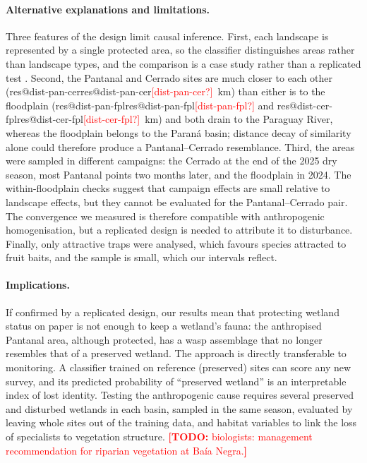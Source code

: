 \documentclass[10pt,a4paper,twocolumn]{article}
\makeatletter
\newif\ifshowtodos \showtodostrue
\newcommand{\TODO}[1]{\ifshowtodos\textcolor{red}{\textbf{[TODO:} #1\textbf{]}}\fi}
\newcommand{\res}[1]{\ifcsname res@#1\endcsname\csname res@#1\endcsname\else\textcolor{red}{[#1?]}\fi}
\makeatother
\begin{document}
\paragraph{Alternative explanations and limitations.}
Three features of the design limit causal inference. First, each landscape is represented by a single
protected area, so the classifier distinguishes areas rather than landscape types, and the
comparison is a case study rather than a replicated test \citep{hurlbert1984}. Second, the Pantanal
and Cerrado sites are much closer to each other (\res{dist-pan-cer}~km) than either is to the
floodplain (\res{dist-pan-fpl} and \res{dist-cer-fpl}~km) and both drain to the Paraguay River, whereas
the floodplain belongs to the Paraná basin; distance decay of similarity \citep{soininen2007} alone
could therefore produce a Pantanal--Cerrado resemblance. Third, the areas were sampled in different
campaigns: the Cerrado at the end of the 2025 dry season, most Pantanal points two months later, and
the floodplain in 2024. The within-floodplain checks suggest that campaign effects are small
relative to landscape effects, but they cannot be evaluated for the Pantanal--Cerrado pair. The
convergence we measured is therefore compatible with anthropogenic homogenisation, but a replicated
design is needed to attribute it to disturbance. Finally, only attractive traps were analysed, which
favours species attracted to fruit baits, and the sample is small, which our intervals reflect.

\paragraph{Implications.}
If confirmed by a replicated design, our results mean that protecting wetland status on paper is not
enough to keep a wetland's fauna: the anthropised Pantanal area, although protected, has a wasp
assemblage that no longer resembles that of a preserved wetland. The approach is directly transferable
to monitoring. A classifier trained on reference (preserved) sites can score any new survey, and its
predicted probability of ``preserved wetland'' is an interpretable index of lost identity. Testing
the anthropogenic cause requires several preserved and disturbed wetlands in each basin, sampled in
the same season, evaluated by leaving whole sites out of the training data, and habitat variables to
link the loss of specialists to vegetation structure. \TODO{biologists: management recommendation for
riparian vegetation at Baía Negra.}
\end{document}

